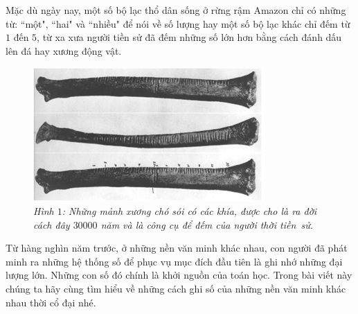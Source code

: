 \begin{multicols}{2}
		Mặc dù ngày nay, một số bộ lạc thổ dân sống ở rừng rậm Amazon chỉ có những từ: ``một", ``hai" và ``nhiều" để nói về số lượng hay một số bộ lạc khác chỉ đếm từ $1$ đến $5$, từ xa xưa người tiền sử đã đếm những số lớn hơn bằng cách đánh dấu lên đá hay xương động vật.
	\vskip 0.1cm
	\begin{figure}[H]
		\centering
		\vspace*{-5pt}
		\captionsetup{labelformat= empty, justification=centering}
		\includegraphics[width=1\linewidth]{1}
		\caption{\textit{\color{toancuabi}Hình $1$: Những mảnh xương chó sói có các khía, được cho là ra đời cách đây $30000$ năm và là công cụ để đếm của người thời tiền~sử.}}
		\vspace*{-10pt}
	\end{figure}
	Từ hàng nghìn năm trước, ở những nền văn minh khác nhau, con người đã phát minh ra những hệ thống số để phục vụ mục đích đầu tiên là ghi nhớ những đại lượng lớn. Những con số đó chính là khởi nguồn của toán học. Trong bài viết này chúng ta hãy cùng tìm hiểu về những cách ghi số của những nền văn minh khác nhau thời cổ đại nhé.
	\begin{figure}[H]
		\centering
		\vspace*{-5pt}
		\captionsetup{labelformat= empty, justification=centering}
\end{figure}
\end{multicols}
